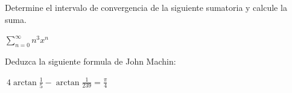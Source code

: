 \documentclass{article}
\theoremstyle{mytheoremstyle}
\theoremstyle{mytheoremstyle}
\theoremstyle{myproblemstyle}
\begin{document}
\begin{problem}[Sumatoria.]

Determine el intervalo de convergencia de la siguiente sumatoria y calcule la suma.

\begin{center}

    $\displaystyle\sum_{n=0}^{\infty}n^{3}x^n   $
\end{center}


\end{problem}






\newpage

\begin{problem}

Deduzca la siguiente formula de John Machin:

\begin{center}

    $\displaystyle\ 4\arctan{\frac{1}{5}} - \arctan{\frac{1}{239}} = \frac{\pi}{4}  $
\end{center}


\end{problem}
\end{document}
